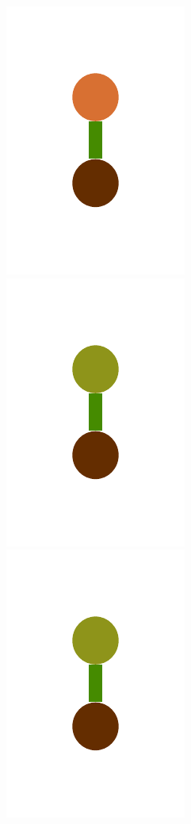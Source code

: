 \documentclass[a4paper,10pt]{article}
\begin{document}
\begin{figure}[t]
\includegraphics[scale=.26]{../figures/vector/4-2-4-noisy-constructor-example-a-0.pdf}
\includegraphics[scale=.26]{../figures/vector/4-2-4-noisy-constructor-example-b-0.pdf}
\includegraphics[scale=.26]{../figures/vector/4-2-4-noisy-constructor-example-b-0.pdf}

\end{figure}
\end{document}
